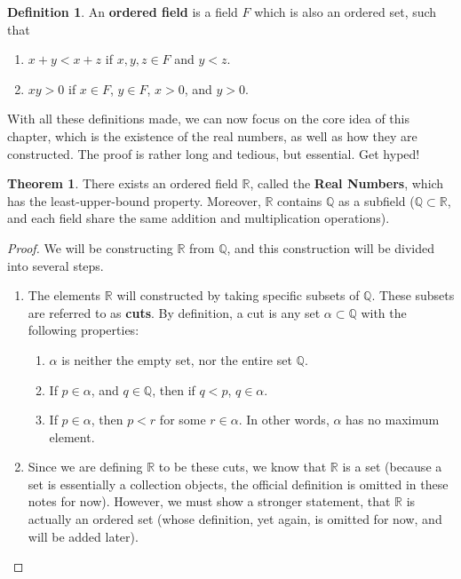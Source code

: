 \documentclass{article}
\theoremstyle{definition}
\newtheorem{definition}{Definition}[section]
\newtheorem{theorem}{Theorem}[section]
\begin{document}
\begin{section}
\begin{definition}
An \textbf{ordered field} is a field $F$ which is also an ordered set, such that 
\begin{enumerate}
\item[(i)] $x + y < x + z$ if $x,y,z \in F$ and $y < z$.
\item[(ii)] $xy > 0$ if $x \in F$, $y \in F$, $x > 0$, and $y > 0$.
\end{enumerate}
\end{definition}
\noindent With all these definitions made, we can now focus on the core idea of this chapter, which is the existence of the real numbers, as well as how they are constructed. The proof is rather long and tedious, but essential. Get hyped!
\begin{theorem}
There exists an ordered field $\mathbb{R}$, called the \textbf{Real Numbers}, which has the least-upper-bound property. Moreover, $\mathbb{R}$ contains $\mathbb{Q}$ as a subfield ($\mathbb{Q} \subset \mathbb{R}$, and each field share the same addition and multiplication operations).
\end{theorem}

\begin{proof}
We will be constructing $\mathbb{R}$ from $\mathbb{Q}$, and this construction will be divided into several steps.
\begin{enumerate}
\item[Step 1:] The elements $\mathbb{R}$ will constructed by taking specific subsets of $\mathbb{Q}$. These subsets are referred to as \textbf{cuts}. By definition, a cut is any set $\alpha \subset \mathbb{Q}$ with the following properties:
\begin{enumerate}
\item[(i)] $\alpha$ is neither the empty set, nor the entire set $\mathbb{Q}$.
\item[(ii)] If $ p \in \alpha$, and $q \in \mathbb{Q}$, then if $q < p$, $q \in \alpha$.
\item[(iii)] If $p \in \alpha$, then $p < r$ for some $r \in \alpha$. In other words, $\alpha$ has no maximum element.
\end{enumerate}

\item[Step 2:] Since we are defining $\mathbb{R}$ to be these cuts, we know that $\mathbb{R}$ is a set (because a set is essentially a collection objects, the official definition is omitted in these notes for now). However, we must show a stronger statement, that $\mathbb{R}$ is actually an ordered set (whose definition, yet again, is omitted for now, and will be added later). 
\end{enumerate}
\end{proof}
\end{section}

 
 
 
\end{document}
